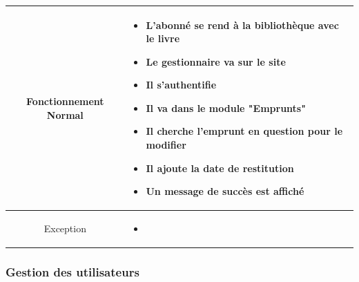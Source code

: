 \par 
\begin{tabular}{|c|p{7cm}|}
        \hline
        Fonctionnement Normal & \begin{itemize}
                \item L'abonné se rend à la bibliothèque avec le livre
                \item Le gestionnaire va sur le site
                \item Il s'authentifie
                \item Il va dans le module "Emprunts"
                \item Il cherche l'emprunt en question pour le modifier
                \item Il ajoute la date de restitution
                \item Un message de succès est affiché
        \end{itemize} \\
        \hline
        Exception & \begin{itemize}
                \item 
        \end{itemize} \\
        \hline
\end{tabular}

\subsubsection{Gestion des utilisateurs} 
